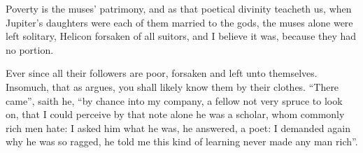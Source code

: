 
Poverty is the muses' patrimony, and as that poetical divinity teacheth us,
when Jupiter's daughters were each of them married to the gods, the muses alone
were left solitary, Helicon forsaken of all suitors, and I believe it was,
because they had no portion.

%

Ever since all their followers are poor, forsaken and left unto themselves.
Insomuch, that as \Petronius argues, you shall likely know
them by their clothes. \enquote{There came}, saith he, \enquote{by chance into my company, a
fellow not very spruce to look on, that I could perceive by that note alone he
was a scholar, whom commonly rich men hate: I asked him what he was, he
answered, a poet: I demanded again why he was so ragged, he told me this kind
of learning never made any man rich}.

